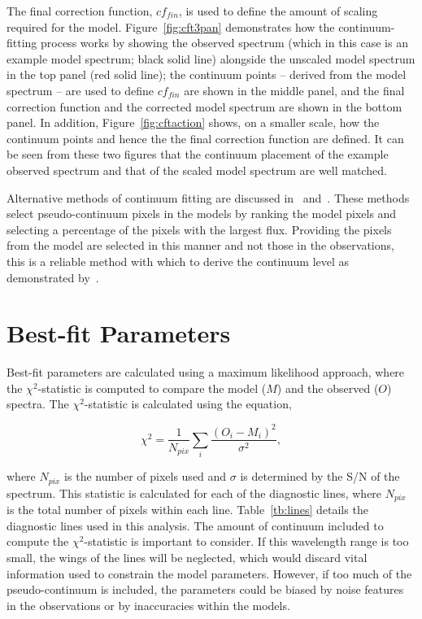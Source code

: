 The final correction function, $cf_{fin}$,
is used to define the amount of scaling required for the model.
Figure~\ref{fig:cft3pan} demonstrates how the continuum-fitting process works by showing the observed spectrum (which in this case is an example model spectrum; black solid line) alongside the unscaled model spectrum in the top panel (red solid line); the continuum points -- derived from the model spectrum -- are used to define $cf_{fin}$ are shown in the middle panel, and the final correction function and the corrected model spectrum are shown in the bottom panel.
In addition, Figure~\ref{fig:cftaction} shows, on a smaller scale, how the continuum points and hence the the final correction function are defined.
It can be seen from these two figures that the continuum placement of the example observed spectrum and that of the scaled model spectrum are well matched.

Alternative methods of continuum fitting are discussed in~\cite{2010MNRAS.407.1203D} and~\cite{2011A&A...527A..50E}.
These methods select pseudo-continuum pixels in the models by ranking the model pixels and selecting a percentage of the pixels with the largest flux.
Providing the pixels from the model are selected in this manner and not those in the observations, this is a reliable method with which to derive the continuum level as demonstrated by~\cite{2015ApJ...806...21D}.

\section{Best-fit Parameters} %
\label{sec:best_fit_parameters}

Best-fit parameters are calculated using a maximum likelihood approach, where the $\chi^{2}$-statistic is computed to compare the model ($M$) and the observed ($O$) spectra.
The $\chi^{2}$-statistic is calculated using the equation,

\begin{equation}
    \chi^{2} = \frac{1}{N_{pix}}\sum\limits_{i}{\frac{(O_{i} - M_{i})^{2}}{\sigma^{2}}},\label{eq:chisq}
\end{equation}

where $N_{pix}$ is the number of pixels used
and $\sigma$ is determined by the S/N of the spectrum.
This statistic is calculated for each of the diagnostic lines, where $N_{pix}$ is the total number of pixels within each line.
Table~\ref{tb:lines} details the diagnostic lines used in this analysis.
The amount of continuum included to compute the $\chi^{2}$-statistic is important to consider.
If this wavelength range is too small, the wings of the lines will be neglected,
which would discard vital information used to constrain the model parameters.
However, if too much of the pseudo-continuum is included, the parameters could be biased by noise features in the observations or by inaccuracies within the models.

